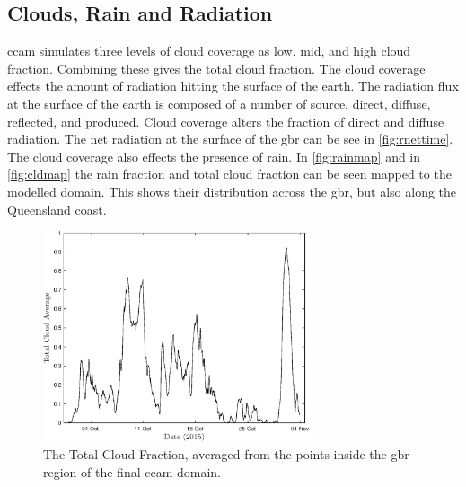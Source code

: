 \subsection{Clouds, Rain and Radiation}
\label{subsec:cloudsresults}

\gls{ccam} simulates three levels of cloud coverage as low, mid, and high cloud fraction. Combining these gives the total cloud fraction. The cloud coverage effects the amount of radiation hitting the surface of the earth. The radiation flux at the surface of the earth is composed of a number of source, direct, diffuse, reflected, and produced. Cloud coverage alters the fraction of direct and diffuse radiation. The net radiation at the surface of the \gls{gbr} can be see in \cref{fig:rnettime}. The cloud coverage also effects the presence of rain. In \cref{fig:rainmap} and in \cref{fig:cldmap} the rain fraction and total cloud fraction can be seen mapped to the modelled domain. This shows their distribution across the \gls{gbr}, but also along the Queensland coast.

\begin{figure}[!hbt]
    \centering
    \includegraphics[width=0.70\textwidth]{Fig/Research/CCAM/GBRAveragedPlot_cld.eps}
    \caption{ The Total Cloud Fraction, averaged from the points inside the \gls{gbr} region of the final \gls{ccam} domain. }
    \label{fig:cldtime}
\end{figure}

